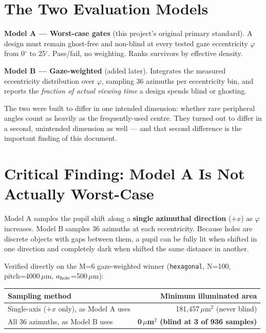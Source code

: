 \section{The Two Evaluation Models}

\textbf{Model A --- Worst-case gates} (this project's original primary
standard). A design must remain ghost-free and non-blind at every tested
gaze eccentricity $\varphi$ from 0$^\circ$ to 25$^\circ$. Pass/fail, no
weighting. Ranks survivors by effective density.

\textbf{Model B --- Gaze-weighted} (added later). Integrates the measured
eccentricity distribution over $\varphi$, sampling 36 azimuths per
eccentricity bin, and reports the \emph{fraction of actual viewing time}
a design spends blind or ghosting.

The two were built to differ in one intended dimension: whether rare
peripheral angles count as heavily as the frequently-used centre. They
turned out to differ in a second, unintended dimension as well --- and
that second difference is the important finding of this document.

\section{Critical Finding: Model A Is Not Actually Worst-Case}

Model A samples the pupil shift along a \textbf{single azimuthal
direction} ($+x$) as $\varphi$ increases. Model B samples 36 azimuths at
each eccentricity. Because holes are discrete objects with gaps between
them, a pupil can be fully lit when shifted in one direction and
completely dark when shifted the same distance in another.

Verified directly on the M=6 gaze-weighted winner
(\texttt{hexagonal}, N=100, pitch=4000\,$\mu$m, $a_{\rm hole}$=500\,$\mu$m):

\begin{center}
\begin{tabular}{lr}
\toprule
Sampling method & Minimum illuminated area \\
\midrule
Single-axis ($+x$ only), as Model A uses & 181{,}457\,$\mu$m$^2$ (never blind) \\
All 36 azimuths, as Model B uses & \textbf{0\,$\mu$m$^2$ (blind at 3 of 936 samples)} \\
\bottomrule
\end{tabular}
\end{center}


\newpage
